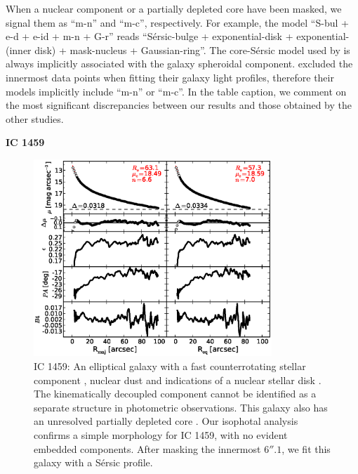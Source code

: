 \documentclass[preprint2]{emulateapj}
\newcommand{\fitfigurewidth}{0.8\textwidth}
\begin{document}
  When a nuclear component or a partially depleted core have been masked, we signal them as ``m-n'' and ``m-c'', respectively.
  For example, the model ``S-bul + e-d + e-id + m-n + G-r'' reads ``S\'ersic-bulge + exponential-disk + exponential-(inner disk) + mask-nucleus + Gaussian-ring''. 
  The core-S\'ersic model used by \cite{rusli2013} is always implicitly associated with the galaxy spheroidal component. 
  \citeauthor{grahamdriver2007} excluded the innermost data points when fitting their galaxy light profiles,  
  therefore their models implicitly include ``m-n'' or ``m-c''. 
  In the table caption, we comment on the most significant discrepancies between our results and those obtained by the other studies. 

  \clearpage\newpage\noindent
  {\bf IC 1459 \\}

  \begin{figure}[h]
  \begin{center}
  \includegraphics[width=\fitfigurewidth]{images/ic1459_1Dfit.eps}
  \caption{IC 1459: 
  An elliptical galaxy with a fast counterrotating stellar component \citep{franxillingworth1988ic1459,cappellari2002ic1459},
  nuclear dust and indications of a nuclear stellar disk \citep{forbes1994ic1459}.
  The kinematically decoupled component cannot be identified as a separate structure in photometric observations.
  This galaxy also has an unresolved partially depleted core \citep{rusli2013}.  %
  Our isophotal analysis confirms a simple morphology for IC 1459, with no evident embedded components.
  After masking the innermost $6''.1$, we fit this galaxy with a S\'ersic profile.  }
  \end{center}
  \end{figure}
\end{document}
